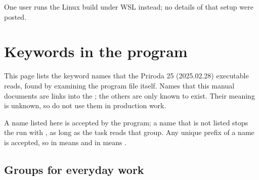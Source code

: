 \documentclass[letterpaper,10pt,english,openany,oneside]{sphinxmanual}
\begin{document}
\sphinxAtStartPar
One user runs the Linux build under WSL instead; no details of that setup were posted. 

\appendix

\sphinxstepscope


\chapter{Keywords in the program}
\label{\detokenize{binary-keywords:keywords-in-the-program}}\label{\detokenize{binary-keywords:binary-keywords}}\label{\detokenize{binary-keywords::doc}}
\sphinxAtStartPar
This page lists the keyword names that the Priroda 25 (2025.02.28) executable reads, found by examining the
program file itself. Names that this manual documents are links into the {\hyperref[\detokenize{reference/index::doc}]{}};
the others are only known to exist. Their meaning is unknown, so do not use them in production work.



\sphinxAtStartPar
A name listed here is accepted by the program; a name that is not listed stops the run with
, as long as the task reads that group. Any unique prefix of a name is
accepted, so  in  means  and  in  means .




\section{Groups for everyday work}
\label{\detokenize{binary-keywords:groups-for-everyday-work}}
\end{document}
